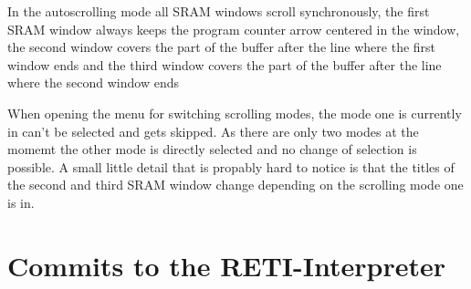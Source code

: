 \documentclass{report}
\begin{document}
In the \alert{autoscrolling} mode all SRAM windows scroll synchronously, the first SRAM window always keeps the program counter arrow centered in the window, the second window covers the part of the buffer after the line where the first window ends and the third window covers the part of the buffer after the line where the second window ends

When opening the menu for switching scrolling modes, the mode one is currently in can't be selected and gets skipped. As there are only two modes at the momemt the other mode is directly selected and no change of selection is possible. A small little detail that is propably hard to notice is that the titles of the second and third SRAM window change depending on the scrolling mode one is in.


\section{Commits to the RETI-Interpreter}
\label{sec:commits to the reti-interpreter}
\end{document}

